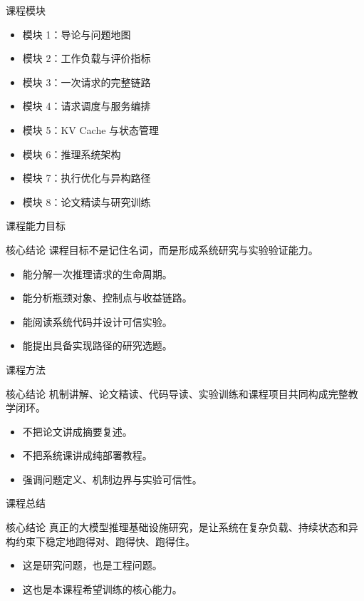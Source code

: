 \documentclass[11pt,aspectratio=169]{ctexbeamer}
\newcommand{\Core}[1]{
  \begin{block}{核心结论}
    #1
  \end{block}
}
\begin{document}
\begin{frame}{课程模块}
  \begin{itemize}
    \item 模块 1：导论与问题地图
    \item 模块 2：工作负载与评价指标
    \item 模块 3：一次请求的完整链路
    \item 模块 4：请求调度与服务编排
    \item 模块 5：KV Cache 与状态管理
    \item 模块 6：推理系统架构
    \item 模块 7：执行优化与异构路径
    \item 模块 8：论文精读与研究训练
  \end{itemize}
\end{frame}

\begin{frame}{课程能力目标}
  \Core{课程目标不是记住名词，而是形成系统研究与实验验证能力。}
  \begin{itemize}
    \item 能分解一次推理请求的生命周期。
    \item 能分析瓶颈对象、控制点与收益链路。
    \item 能阅读系统代码并设计可信实验。
    \item 能提出具备实现路径的研究选题。
  \end{itemize}
\end{frame}

\begin{frame}{课程方法}
  \Core{机制讲解、论文精读、代码导读、实验训练和课程项目共同构成完整教学闭环。}
  \begin{itemize}
    \item 不把论文讲成摘要复述。
    \item 不把系统课讲成纯部署教程。
    \item 强调问题定义、机制边界与实验可信性。
  \end{itemize}
\end{frame}

\begin{frame}{课程总结}
  \Core{真正的大模型推理基础设施研究，是让系统在复杂负载、持续状态和异构约束下稳定地跑得对、跑得快、跑得住。}
  \begin{itemize}
    \item 这是研究问题，也是工程问题。
    \item 这也是本课程希望训练的核心能力。
  \end{itemize}
\end{frame}
\end{document}
